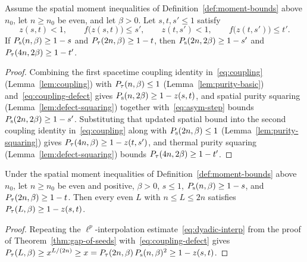 \begin{lemma}
  \label{lem:doubling-step}
  \leanok
  Assume the spatial moment inequalities of Definition~\ref{def:moment-bounds} above \(n_0\), let
  \(n \ge n_0\) be even, and let \(\beta > 0\). Let \(s, t, s' \le 1\) satisfy
  \begin{equation}
    \label{eq:asym-step}
    z(s, t) < 1, \qquad f\bigl(z(s, t)\bigr) \le s', \qquad
    z(t, s') < 1, \qquad f\bigl(z(t, s')\bigr) \le t'.
  \end{equation}
  If \(P_{\mathrm{s}}(n, \beta) \ge 1 - s\) and \(P_{\tau}(2n, \beta) \ge 1 - t\), then
  \(P_{\mathrm{s}}(2n, 2\beta) \ge 1 - s'\) and \(P_{\tau}(4n, 2\beta) \ge 1 - t'\).
\end{lemma}
\begin{proof}
  \leanok
  Combining the first spacetime coupling identity in~\eqref{eq:coupling} (Lemma~\ref{lem:coupling})
  with \(P_{\tau}(n,\beta) \le 1\) (Lemma~\ref{lem:purity-basic}) and~\eqref{eq:coupling-defect} gives
  \(P_{\mathrm{s}}(n, 2\beta) \ge 1 - z(s, t)\), and spatial purity squaring (Lemma~\ref{lem:defect-squaring})
  together with~\eqref{eq:asym-step} bounds \(P_{\mathrm{s}}(2n, 2\beta) \ge 1 - s'\). Substituting that
  updated spatial bound into the second coupling identity in~\eqref{eq:coupling} along with
  \(P_{\mathrm{s}}(2n, \beta) \le 1\) (Lemma~\ref{lem:purity-squaring}) gives
  \(P_{\tau}(4n, \beta) \ge 1 - z(t, s')\), and thermal purity squaring (Lemma~\ref{lem:defect-squaring})
  bounds \(P_{\tau}(4n, 2\beta) \ge 1 - t'\).
\end{proof}

\begin{lemma}
  \label{lem:window}
  \leanok
  Under the spatial moment inequalities of Definition~\ref{def:moment-bounds} above \(n_0\), let
  \(n \ge n_0\) be even and positive, \(\beta > 0\), \(s \le 1\), \(P_{\mathrm{s}}(n, \beta) \ge 1 - s\), and
  \(P_{\tau}(2n, \beta) \ge 1 - t\). Then every even \(L\) with \(n \le L \le 2n\) satisfies
  \(P_{\tau}(L, \beta) \ge 1 - z(s, t)\).
\end{lemma}
\begin{proof}
  \leanok
  Repeating the \(\ell^p\)-interpolation estimate~\eqref{eq:dyadic-interp} from the proof of
  Theorem~\ref{thm:gap-of-seeds} with~\eqref{eq:coupling-defect} gives
  \(P_{\tau}(L, \beta) \ge x^{L/(2n)} \ge x = P_{\tau}(2n, \beta)\, P_{\mathrm{s}}(n, \beta)^2 \ge 1 - z(s, t)\).
\end{proof}

